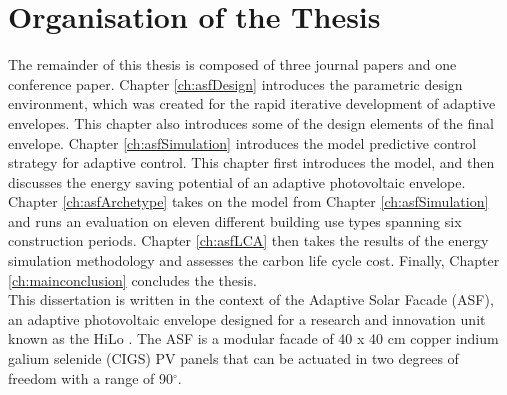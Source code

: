 



\newpage



\section{Organisation of the Thesis}

The remainder of this thesis is composed of three journal papers and one conference paper. Chapter \ref{ch:asfDesign} introduces the parametric design environment, which was created for the rapid iterative development of adaptive envelopes. This chapter also introduces some of the design elements of the final envelope. Chapter \ref{ch:asfSimulation} introduces the model predictive control strategy for adaptive control. This chapter first introduces the model, and then discusses the energy saving potential of an adaptive photovoltaic envelope. Chapter \ref{ch:asfArchetype} takes on the model from Chapter \ref{ch:asfSimulation} and runs an evaluation on eleven different building use types spanning six construction periods. Chapter \ref{ch:asfLCA} then takes the results of the energy simulation methodology and assesses the carbon life cycle cost. Finally, Chapter \ref{ch:mainconclusion} concludes the thesis. \\

This dissertation is written in the context of the Adaptive Solar Facade (ASF), an adaptive photovoltaic envelope designed for a research and innovation unit known as the HiLo \cite{Block2017}. The ASF is a modular facade of 40 x 40 cm copper indium galium selenide (CIGS) PV panels that can be actuated in two degrees of freedom with a range of 90$^{\circ}$. 